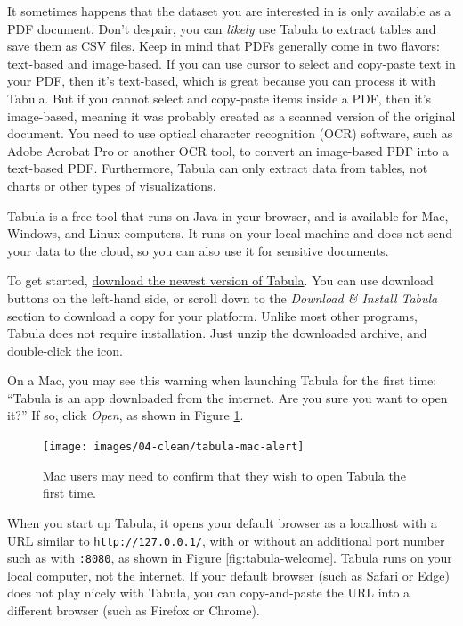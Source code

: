 \documentclass[
  english,
]{book}
\begin{document}
It sometimes happens that the dataset you are interested in is only available as a PDF document. Don't despair, you can \emph{likely} use Tabula to extract tables and save them as CSV files. Keep in mind that PDFs generally come in two flavors: text-based and image-based. If you can use cursor to select and copy-paste text in your PDF, then it's text-based, which is great because you can process it with Tabula. But if you cannot select and copy-paste items inside a PDF, then it's image-based, meaning it was probably created as a scanned version of the original document. You need to use optical character recognition (OCR) software, such as Adobe Acrobat Pro or another OCR tool, to convert an image-based PDF into a text-based PDF. Furthermore, Tabula can only extract data from tables, not charts or other types of visualizations.

Tabula is a free tool that runs on Java in your browser, and is available for Mac, Windows, and Linux computers. It runs on your local machine and does not send your data to the cloud, so you can also use it for sensitive documents.

To get started, \href{https://tabula.technology/}{download the newest version of Tabula}.
You can use download buttons on the left-hand side, or scroll down to the \emph{Download \& Install Tabula} section to download a copy for your platform. Unlike most other programs, Tabula does not require installation. Just unzip the downloaded archive, and double-click the icon.

On a Mac, you may see this warning when launching Tabula for the first time: ``Tabula is an app downloaded from the internet. Are you sure you want to open it?'' If so, click \emph{Open}, as shown in Figure \ref{fig:tabula-mac-alert}.



\begin{figure}
\texttt{[image: images/04-clean/tabula-mac-alert]} \caption{Mac users may need to confirm that they wish to open Tabula the first time.}\label{fig:tabula-mac-alert}
\end{figure}

When you start up Tabula, it opens your default browser as a localhost with a URL similar to \texttt{http://127.0.0.1/}, with or without an additional port number such as with \texttt{:8080}, as shown in Figure \ref{fig:tabula-welcome}. Tabula runs on your local computer, not the internet. If your default browser (such as Safari or Edge) does not play nicely with Tabula, you can copy-and-paste the URL into a different browser (such as Firefox or Chrome).
\end{document}
